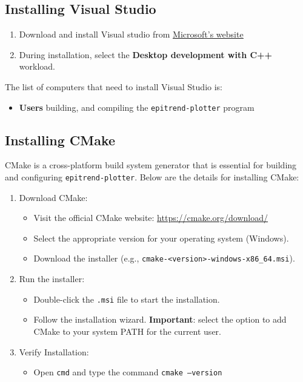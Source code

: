 \documentclass{article}
\begin{document}
\subsection{Installing Visual Studio}
\begin{enumerate}
    \item Download and install Visual studio from \href{https://visualstudio.microsoft.com/}{\underline{Microsoft's website}}
    
    \item During installation, select the \textbf{Desktop development with C++} workload.
\end{enumerate}
The list of computers that need to install Visual Studio is:
\begin{itemize}
    \item \textbf{Users} building, and compiling the \texttt{epitrend-plotter} program
\end{itemize}

\subsection{Installing CMake}
CMake is a cross-platform build system generator that is essential for building and configuring \texttt{epitrend-plotter}. Below are the details for installing CMake:

\begin{enumerate}
    \item Download CMake:
    \begin{itemize}
        \item Visit the official CMake website: \href{https://cmake.org/download/}{\underline{https://cmake.org/download/}}
        \item Select the appropriate version for your operating system (Windows).
        \item Download the installer (e.g., \texttt{cmake-<version>-windows-x86\_64.msi}).
    \end{itemize}
    \item Run the installer:
    \begin{itemize}
        \item Double-click the \texttt{.msi} file to start the installation.
        \item Follow the installation wizard. \textbf{Important}: select the option to add CMake to your system PATH for the current user.
    \end{itemize}
    \item Verify Installation:
    \begin{itemize}
        \item Open \texttt{cmd} and type the command \texttt{cmake --version}
    \end{itemize}
\end{enumerate}
\end{document}
